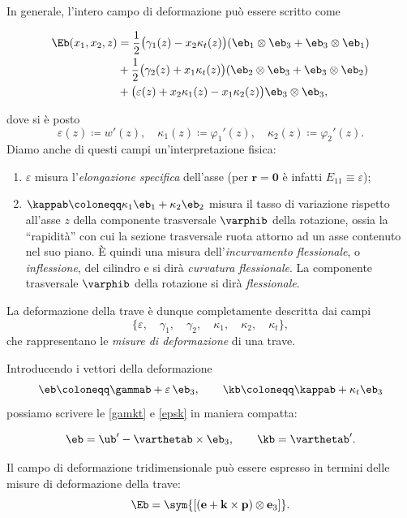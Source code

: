 In generale, l'intero campo di deformazione può essere scritto come
\begin{definition}
	\begin{equation}\label{E3D}
	\begin{aligned}
\Eb(x_1,x_2,z)&=\frac{1}{2}\big(\gamma_1(z)-x_2\kappa_t(z) \big)(\eb_1\otimes\eb_3+\eb_3\otimes\eb_1)\\
&+\frac{1}{2}\big(\gamma_2(z)+x_1\kappa_t(z) \big)(\eb_2\otimes\eb_3+\eb_3\otimes\eb_2)\\
&+\big(\varepsilon(z)+x_2\kappa_1(z)-x_1\kappa_2(z)\big)\eb_3\otimes\eb_3,
\end{aligned}
\end{equation}
\end{definition}
dove si è posto
\begin{equation}\label{epsk}
	\varepsilon(z)\coloneqq w'(z), \quad \kappa_1(z)\coloneqq \varphi_1'(z), \quad  \kappa_2(z)\coloneqq \varphi_2'(z).
\end{equation}
Diamo anche di questi campi un'interpretazione fisica:
\begin{enumerate}
\item $\varepsilon$ misura l'\emph{elongazione specifica} dell'asse (per $\mathbf{r}=\mathbf{0}$ è infatti $E_{11} \equiv \varepsilon$);
\item $\kappab\coloneqq \kappa_1\eb_1+\kappa_2\eb_2$ misura il tasso di variazione rispetto all'asse $z$ della componente trasversale $\varphib$ della rotazione, ossia la ``rapidità'' con cui la sezione trasversale ruota attorno ad un asse contenuto nel suo piano. \`{E} quindi una misura dell'\emph{incurvamento flessionale}, o \emph{inflessione}, del cilindro e si dirà \emph{curvatura flessionale}. 
La componente trasversale $\varphib$ della rotazione si dirà \emph{flessionale}.
\end{enumerate}

La deformazione della trave è dunque completamente descritta dai campi
\begin{equation}\label{cdd}
	\{ \varepsilon, \quad \gamma_1,  \quad\gamma_2, \quad\kappa_1, \quad\kappa_2, \quad\kappa_t \},
\end{equation}
che rappresentano le \textit{misure di deformazione} di una trave. 

Introducendo i vettori della deformazione
\begin{equation}
\eb\coloneqq \gammab +\varepsilon\,\eb_3,  \qquad \kb\coloneqq \kappab+\kappa_t \eb_3
\end{equation}
possiamo scrivere le \eqref{gamkt} e \eqref{epsk} in maniera compatta:
\begin{definition}
	\begin{equation}\label{congrtr}
\eb=\ub'-\varthetab\times \eb_3,  \qquad \kb=\varthetab'.
\end{equation}
\end{definition}
Il campo di deformazione tridimensionale può essere espresso in termini delle misure di deformazione della trave:
\begin{equation}\label{Etr}
	\Eb=\sym{[(\mathbf{e} + \mathbf{k} \times \mathbf{p}) \otimes \mathbf{e}_3]}.
\end{equation}


